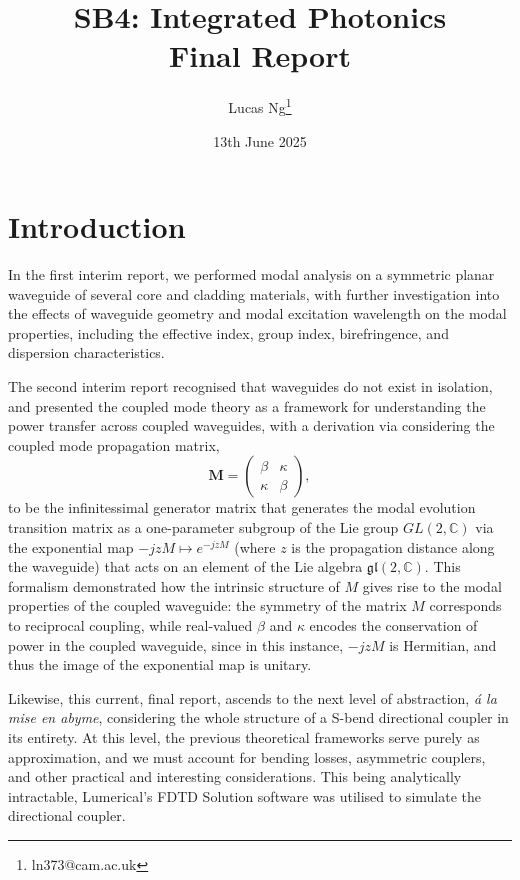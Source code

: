 \documentclass[10pt, a4paper]{article}
\title{\Large \bfseries SB4: Integrated Photonics\\[0.5em] \large Final Report}
\author{Lucas Ng\thanks{ln373@cam.ac.uk}}
\date{13th June 2025}
\begin{document}
\maketitle

\section{Introduction}

In the first interim report, we performed modal analysis on a symmetric planar waveguide
of several core and cladding materials, with further investigation into the effects of waveguide geometry and modal excitation wavelength on the modal properties,
including the effective index, group index, birefringence, and dispersion characteristics.

The second interim report recognised that waveguides do not exist in isolation,
and presented the coupled mode theory as a framework for understanding the power transfer across coupled waveguides,
with a derivation via considering the coupled mode propagation matrix,
\[
\mathbf{M} = \begin{pmatrix}
\beta & \kappa \\
\kappa & \beta
\end{pmatrix},
\]
to be the infinitessimal generator matrix that generates the modal evolution transition matrix as 
a one-parameter subgroup of the Lie group \(GL(2, \mathbb{C})\)
via the exponential map \(-jzM\mapsto e^{-jzM}\) (where \(z\) is the propagation distance along the waveguide)
that acts on an element of the Lie algebra \(\mathfrak{gl}(2, \mathbb{C})\).
This formalism demonstrated how the intrinsic structure of \(M\) gives rise to the modal properties of the coupled waveguide:
the symmetry of the matrix \(M\) corresponds to reciprocal coupling,
while real-valued \(\beta\) and \(\kappa\) encodes the conservation of power in the coupled waveguide,
since in this instance, \(-jzM\) is Hermitian, and thus the image of the exponential map is unitary.

Likewise, this current, final report, ascends to the next level of abstraction,
\textit{\'a la mise en abyme},
considering the whole structure of a S-bend directional coupler in its entirety.
At this level, the previous theoretical frameworks serve purely as approximation,
and we must account for bending losses, asymmetric couplers, and other practical and interesting considerations.
This being analytically intractable, Lumerical's FDTD Solution software\autocite{lumerical_fdtd} was utilised to simulate the directional coupler.
\end{document}
